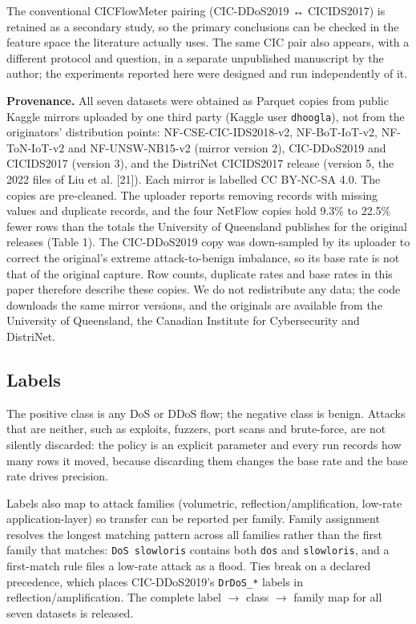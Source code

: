 \documentclass[11pt,a4paper]{article}
\begin{document}
The conventional CICFlowMeter pairing (CIC-DDoS2019 ↔ CICIDS2017) is retained as a secondary study, so the primary conclusions can be checked in the feature space the literature actually uses. The same CIC pair also appears, with a different protocol and question, in a separate unpublished manuscript by the author; the experiments reported here were designed and run independently of it.

\textbf{Provenance.} All seven datasets were obtained as Parquet copies from public Kaggle mirrors uploaded by one third party (Kaggle user \texttt{dhoogla}), not from the originators' distribution points: NF-CSE-CIC-IDS2018-v2, NF-BoT-IoT-v2, NF-ToN-IoT-v2 and NF-UNSW-NB15-v2 (mirror version 2), CIC-DDoS2019 and CICIDS2017 (version 3), and the DistriNet CICIDS2017 release (version 5, the 2022 files of Liu et al. [21]). Each mirror is labelled CC BY-NC-SA 4.0. The copies are pre-cleaned. The uploader reports removing records with missing values and duplicate records, and the four NetFlow copies hold 9.3\% to 22.5\% fewer rows than the totals the University of Queensland publishes for the original releases (Table 1). The CIC-DDoS2019 copy was down-sampled by its uploader to correct the original's extreme attack-to-benign imbalance, so its base rate is not that of the original capture. Row counts, duplicate rates and base rates in this paper therefore describe these copies. We do not redistribute any data; the code downloads the same mirror versions, and the originals are available from the University of Queensland, the Canadian Institute for Cybersecurity and DistriNet.

\subsection{Labels}

The positive class is any DoS or DDoS flow; the negative class is benign. Attacks that are neither, such as exploits, fuzzers, port scans and brute-force, are not silently discarded: the policy is an explicit parameter and every run records how many rows it moved, because discarding them changes the base rate and the base rate drives precision.

Labels also map to attack families (volumetric, reflection/amplification, low-rate application-layer) so transfer can be reported per family. Family assignment resolves the longest matching pattern across all families rather than the first family that matches: \texttt{DoS slowloris} contains both \texttt{dos} and \texttt{slowloris}, and a first-match rule files a low-rate attack as a flood. Ties break on a declared precedence, which places CIC-DDoS2019's \texttt{DrDoS\_*} labels in reflection/amplification. The complete label $\rightarrow$ class $\rightarrow$ family map for all seven datasets is released.
\end{document}
